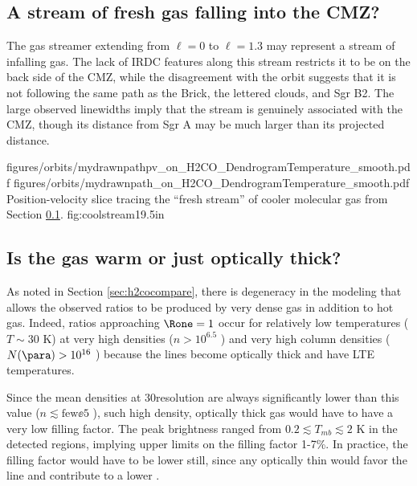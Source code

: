 
\subsection{A stream of fresh gas falling into the CMZ?}
\label{sec:coolstream}
The gas streamer extending from $\ell=0$ to $\ell=1.3$ may represent a stream
of infalling gas.  The lack of IRDC features along this stream restricts it to
be on the back side of the CMZ, while the disagreement with the
\citet{Kruijssen2014d} orbit suggests that it is not following the same path as
the Brick, the lettered clouds, and Sgr B2.  The large observed linewidths
imply that the stream is genuinely associated with the CMZ, though its distance
from Sgr A may be much larger than its projected distance.

\RotFigureTwoAA
{figures/orbits/mydrawnpathpv_on_H2CO_DendrogramTemperature_smooth.pdf}
{figures/orbits/mydrawnpath_on_H2CO_DendrogramTemperature_smooth.pdf}
{Position-velocity slice tracing the ``fresh stream'' of cooler molecular
gas from Section \ref{sec:coolstream}.}
{fig:coolstream}{1}{9.5in}

\subsection{Is the gas warm or just optically thick?}
As noted in Section \ref{sec:h2cocompare}, there is degeneracy in the modeling
that allows the observed ratios to be produced by very dense gas in addition to
hot gas.  Indeed, ratios approaching $\Rone=1$ occur for relatively low
temperatures ($T\sim30$ K) at very high densities ($n>10^{6.5}$ \percc)
and very high column densities ($N(\para)>10^{16}$ \perkms \persc) because
the lines become optically thick and have LTE temperatures.

Since the mean densities at 30\arcsec resolution are always significantly lower
than this value ($n\lesssim\mathrm{few}\ee{5}$ \percc), such high density,
optically thick gas would have to have a very low filling factor.  The peak
\para \threeohthree brightness ranged from $0.2 \lesssim T_{mb} \lesssim 2$ K
in the detected regions, implying upper limits on the filling factor 1-7\%.
In practice, the filling factor would have to be lower still, since any optically
thin \para would favor the \threeohthree line and contribute to a lower \Rone.

